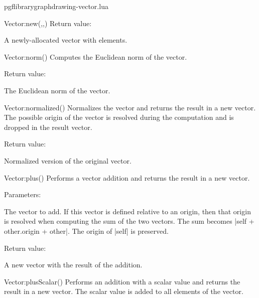 \begin{filedescription}{pgflibrarygraphdrawing-vector.lua}
\begin{luacommand}{{Vector:new}(,,)}
Return value:
\begin{parameterdescription} 
  \item[] A newly-allocated vector with  elements. 
\end{parameterdescription}


\end{luacommand}
\begin{luacommand}{{Vector:norm}()}
Computes the Euclidean norm of the vector. 


Return value:
\begin{parameterdescription} 
  \item[] The Euclidean norm of the vector. 
\end{parameterdescription}


\end{luacommand}
\begin{luacommand}{{Vector:normalized}()}
Normalizes the vector and returns the result in a new vector.  The possible origin of the vector is resolved during the computation and is dropped in the result vector. 


Return value:
\begin{parameterdescription} 
  \item[] Normalized version of the original vector. 
\end{parameterdescription}


\end{luacommand}
\begin{luacommand}{{Vector:plus}()}
Performs a vector addition and returns the result in a new vector. 

Parameters:
\begin{parameterdescription}
	\item[\meta{other}] The vector to add. If this vector is defined relative to an origin, then that origin is resolved when computing the sum of the two vectors. The sum becomes |self + other.origin + other|. The origin of |self| is preserved. 
\end{parameterdescription}


Return value:
\begin{parameterdescription} 
  \item[] A new vector with the result of the addition. 
\end{parameterdescription}


\end{luacommand}
\begin{luacommand}{{Vector:plusScalar}()}
Performs an addition with a scalar value and returns the result in a new vector.  The scalar value is added to all elements of the vector. 


\end{luacommand}
\end{filedescription}
